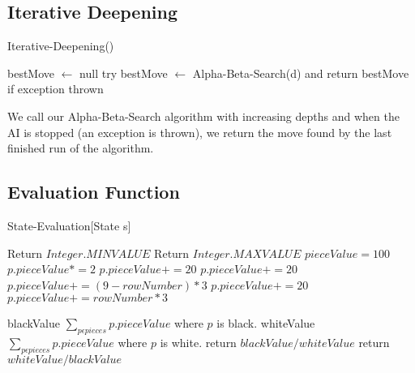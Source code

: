\documentclass[a4paper,twoside,11pt]{article}
\begin{document}
\subsection{Iterative Deepening}
\begin{algorithm}[H]
\caption{Iterative-Deepening()}
\begin{algorithmic}
	\State bestMove $\gets$ null
		\State try bestMove $\gets$ Alpha-Beta-Search(d) and return bestMove if exception thrown
	\EndFor
\end{algorithmic}
\end{algorithm}

We call our Alpha-Beta-Search algorithm with increasing depths and when the AI is stopped (an exception is thrown), we return the move found by the last finished run of the algorithm.

\subsection{Evaluation Function}
\begin{algorithm} [H]
\caption{State-Evaluation[State s]}\label{euclid}
\begin{algorithmic}
  \State Return $Integer.MINVALUE$
  \State Return $Integer.MAXVALUE$
\Else
    \State $pieceValue = 100$
      \State $p.pieceValue *= 2$
        \State $p.pieceValue += 20$
      \EndIf
        \State $p.pieceValue += 20$
      \Else
        \State $p.pieceValue += (9-rowNumber) * 3$
      \EndIf
    \Else
        \State $p.pieceValue += 20$
      \Else
        \State $p.pieceValue += rowNumber * 3$ 
      \EndIf
    \EndIf
  \EndFor
  
  \State blackValue $\sum_{p\epsilon pieces} p.pieceValue $ where $p$ is black.
  \State whiteValue $\sum_{p\epsilon pieces} p.pieceValue $ where $p$ is white.
    \State return $blackValue / whiteValue$
  \Else
    \State return $whiteValue / blackValue$ 
  \EndIf
\EndIf
\end{algorithmic}
\end{algorithm}
\end{document}
